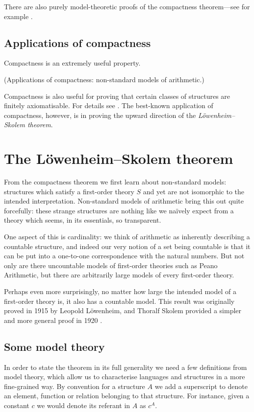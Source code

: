 \documentclass[10pt, a4paper, oneside]{article}
\theoremstyle{definition}
\theoremstyle{remark}
\theoremstyle{plain}
\theoremstyle{plain}
\begin{document}
There are also purely model-theoretic proofs of the compactness theorem---see
for example \citealt[pp. 125--127]{hodges1997}.

\subsection{Applications of compactness}

Compactness is an extremely useful property.

(Applications of compactness: non-standard models of arithmetic.)

Compactness is also useful for proving that certain classes of structures are
finitely axiomatisable. For details see \citealt[pp. 114--116]{vdalen2004}.
The best-known application of compactness, however, is in proving the upward
direction of the \emph{Löwenheim--Skolem theorem}.


\section{The Löwenheim--Skolem theorem}

From the compactness theorem we first learn about non-standard models:
structures which satisfy a first-order theory $S$ and yet are not isomorphic to
the intended interpretation. Non-standard models of arithmetic bring this out
quite forcefully: these strange structures are nothing like we naïvely expect
from a theory which seems, in its essentials, so transparent.

One aspect of this is cardinality: we think of arithmetic as inherently
describing a countable structure, and indeed our very notion of a set being
countable is that it can be put into a one-to-one correspondence with the
natural numbers. But not only are there uncountable models of first-order
theories such as Peano Arithmetic, but there are arbitrarily large models of
every first-order theory.

Perhaps even more surprisingly, no matter how large the intended model of a
first-order theory is, it also has a countable model. This result was originally
proved in 1915 by Leopold Löwenheim, and Thoralf Skolem provided a simpler and
more general proof in 1920 \citep{lowenheim1915, skolem1920}.

\subsection{Some model theory}

In order to state the theorem in its full generality we need a few definitions
from model theory, which allow us to characterise languages and structures in a
more fine-grained way. By convention for a structure $A$ we add a superscript to
denote an element, function or relation belonging to that structure. For
instance, given a constant $c$ we would denote its referant in $A$ as $c^A$.
\end{document}
